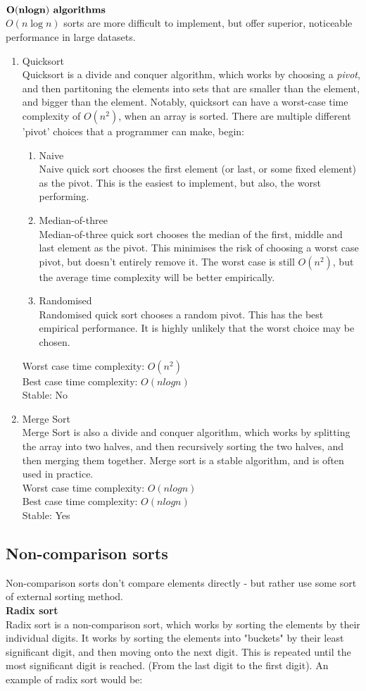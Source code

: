 \documentclass[14]{article}
\begin{document}
$\mathbf{O(nlogn) \text{\textbf{ algorithms}}}$ \\ 
$O(n\log n)$ sorts are more difficult to implement, but offer superior, noticeable performance in large datasets.
\begin{enumerate}
	\item Quicksort \\ 
	Quicksort is a divide and conquer algorithm, which works by choosing a \emph{pivot}, and then partitoning
	the elements into sets that are smaller than the element, and bigger than the element. Notably, quicksort 
	can have a worst-case time complexity of $O(n^2)$, when an array is sorted. There are multiple different 'pivot' choices
	that a programmer can make, begin:
	\begin{enumerate}
		\item Naive \\ 
		Naive quick sort chooses the first element (or last, or some fixed element) as the pivot. 
		This is the easiest to implement, but also, the worst performing. 
		\item Median-of-three \\ 
		Median-of-three quick sort chooses the median of the first, middle and last element as the pivot.
		This minimises the risk of choosing a worst case pivot, but doesn't entirely remove it. The worst case
		is still $O(n^2)$, but the average time complexity will be better empirically.
		\item Randomised \\ 
		Randomised quick sort chooses a random pivot. This has the best empirical performance. It is highly
		unlikely that the worst choice may be chosen.
	\end{enumerate}
	Worst case time complexity: $O(n^2)$ \\ 
	Best case time complexity: $O(nlogn)$ \\ 
	Stable: No 
\item Merge Sort \\
	Merge Sort is also a divide and conquer algorithm, which works by splitting the array into two halves, and then
	recursively sorting the two halves, and then merging them together. Merge sort is a stable algorithm, and is
	often used in practice. \\ 
	Worst case time complexity: $O(nlogn)$ \\ 
	Best case time complexity: $O(nlogn)$ \\ 
	Stable: Yes  
\end{enumerate}
\subsection{Non-comparison sorts}
Non-comparison sorts don't compare elements directly - but rather use some sort of external sorting method. \\
\textbf{Radix sort} \\ 
Radix sort is a non-comparison sort, which works by sorting the elements by their individual digits. 
It works by sorting the elements into "buckets" by their least significant digit, and then moving onto the next digit.
This is repeated until the most significant digit is reached. (From the last digit to the first digit).
An example of radix sort would be:  
\end{document}
